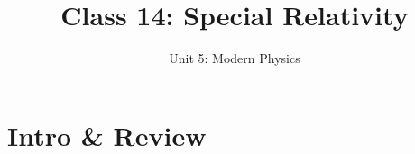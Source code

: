 \documentclass[12pt,compress,aspectratio=169]{beamer}
\title{Class 14: Special Relativity}
\subtitle{Unit 5: Modern Physics}
\begin{document}
\begin{frame}
  \maketitle
\end{frame}



\section{Intro \& Review}

%  
%  



%
%
%
\end{document}
